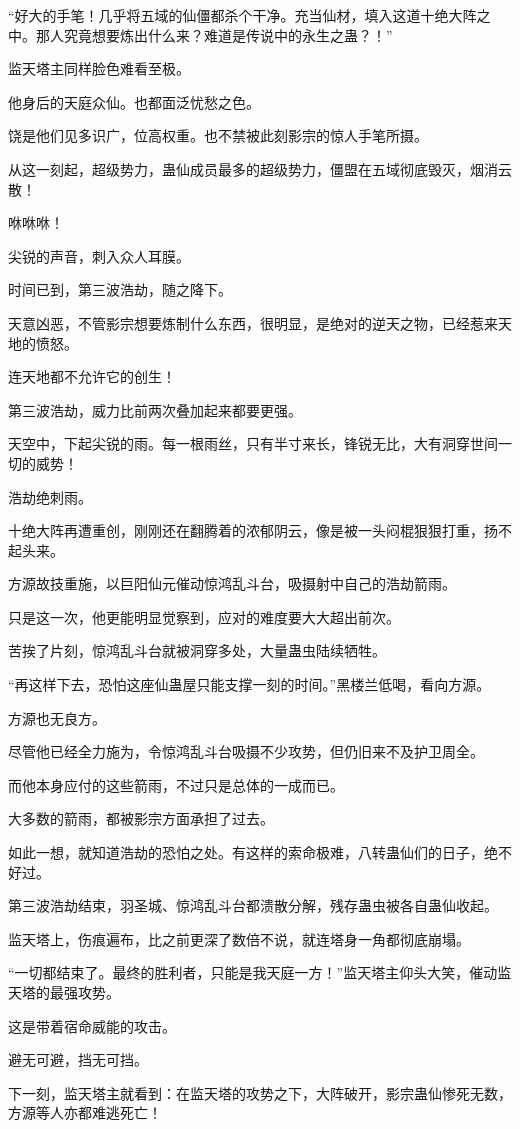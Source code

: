 \begin{this_body}
“好大的手笔！几乎将五域的仙僵都杀个干净。充当仙材，填入这道十绝大阵之中。那人究竟想要炼出什么来？难道是传说中的永生之蛊？！”

监天塔主同样脸色难看至极。

他身后的天庭众仙。也都面泛忧愁之色。

饶是他们见多识广，位高权重。也不禁被此刻影宗的惊人手笔所摄。

从这一刻起，超级势力，蛊仙成员最多的超级势力，僵盟在五域彻底毁灭，烟消云散！

咻咻咻！

尖锐的声音，刺入众人耳膜。

时间已到，第三波浩劫，随之降下。

天意凶恶，不管影宗想要炼制什么东西，很明显，是绝对的逆天之物，已经惹来天地的愤怒。

连天地都不允许它的创生！

第三波浩劫，威力比前两次叠加起来都要更强。

天空中，下起尖锐的雨。每一根雨丝，只有半寸来长，锋锐无比，大有洞穿世间一切的威势！

浩劫绝刺雨。

十绝大阵再遭重创，刚刚还在翻腾着的浓郁阴云，像是被一头闷棍狠狠打重，扬不起头来。

方源故技重施，以巨阳仙元催动惊鸿乱斗台，吸摄射中自己的浩劫箭雨。

只是这一次，他更能明显觉察到，应对的难度要大大超出前次。

苦挨了片刻，惊鸿乱斗台就被洞穿多处，大量蛊虫陆续牺牲。

“再这样下去，恐怕这座仙蛊屋只能支撑一刻的时间。”黑楼兰低喝，看向方源。

方源也无良方。

尽管他已经全力施为，令惊鸿乱斗台吸摄不少攻势，但仍旧来不及护卫周全。

而他本身应付的这些箭雨，不过只是总体的一成而已。

大多数的箭雨，都被影宗方面承担了过去。

如此一想，就知道浩劫的恐怕之处。有这样的索命极难，八转蛊仙们的日子，绝不好过。

第三波浩劫结束，羽圣城、惊鸿乱斗台都溃散分解，残存蛊虫被各自蛊仙收起。

监天塔上，伤痕遍布，比之前更深了数倍不说，就连塔身一角都彻底崩塌。

“一切都结束了。最终的胜利者，只能是我天庭一方！”监天塔主仰头大笑，催动监天塔的最强攻势。

这是带着宿命威能的攻击。

避无可避，挡无可挡。

下一刻，监天塔主就看到：在监天塔的攻势之下，大阵破开，影宗蛊仙惨死无数，方源等人亦都难逃死亡！

\end{this_body}
